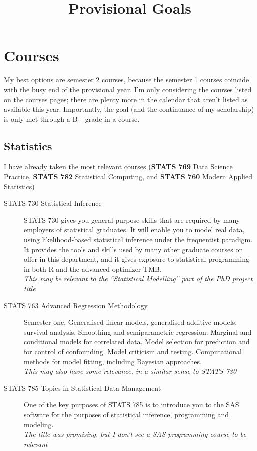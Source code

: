 \documentclass[10pt,a4paper]{article}
\begin{document}
\title{Provisional Goals}\maketitle{}

\section{Courses}
\label{sec:courses}
My best options are semester 2 courses, because the semester 1 courses coincide with the busy end of the provisional year. I'm only considering the courses listed on the courses pages; there are plenty more in the calendar that aren't listed as available this year. Importantly, the goal (and the continuance of my scholarship) is only met through a B+ grade in a course.

\subsection{Statistics}
\label{sec:statistics}

I have already taken the most relevant courses (\textbf{STATS 769} Data Science Practice, \textbf{STATS 782} Statistical Computing, and \textbf{STATS 760} Modern Applied Statistics)

\begin{description}
\item[STATS 730 Statistical Inference] STATS 730 gives you general-purpose skills that are required by many employers of statistical graduates. It will enable you to model real data, using likelihood-based statistical inference under the frequentist paradigm. It provides the tools and skills used by many other graduate courses on offer in this department, and it gives exposure to statistical programming in both R and the advanced optimizer TMB.\\
  \textit{This may be relevant to the ``Statistical Modelling'' part of the PhD project title}
\item[STATS 763 Advanced Regression Methodology] Semester one. 
  Generalised linear models, generalised additive models, survival analysis. Smoothing and semiparametric regression. Marginal and conditional models for correlated data. Model selection for prediction and for control of confounding. Model criticism and testing. Computational methods for model fitting, including Bayesian approaches.\\
  \textit{This may also have some relevance, in a similar sense to STATS 730}
\item[STATS 785 Topics in Statistical Data Management] One of the key purposes of STATS 785 is to introduce you to the SAS software for the purposes of statistical inference, programming and modeling.\\
  \textit{The title was promising, but I don't see a SAS programming course to be relevant}
\end{description}
\end{document}
